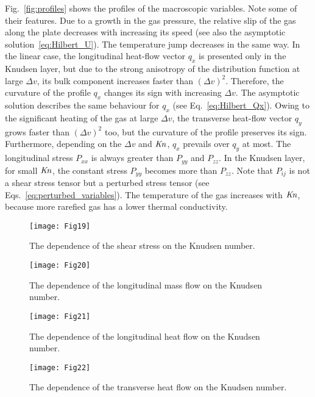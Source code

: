 \documentclass[final]{jfm} %
\newcommand{\Kn}{\mbox{\textit{Kn}}}
\begin{document}
Fig.~\ref{fig:profiles} shows the profiles of the macroscopic variables.
Note some of their features.
Due to a growth in the gas pressure, the relative slip of the gas along the plate decreases
with increasing its speed (see also the asymptotic solution~\eqref{eq:Hilbert_U}).
The temperature jump decreases in the same way.
In the linear case, the longitudinal heat-flow vector \(q_x\) is presented only in the Knudsen layer,
but due to the strong anisotropy of the distribution function at large \(\Delta{v}\),
its bulk component increases faster than \((\Delta{v})^2\).
Therefore, the curvature of the profile \(q_x\) changes its sign with increasing \(\Delta{v}\).
The asymptotic solution describes the same behaviour for \(q_x\) (see Eq.~\eqref{eq:Hilbert_Qx}).
Owing to the significant heating of the gas at large \(\Delta{v}\),
the transverse heat-flow vector \(q_y\) grows faster than \((\Delta{v})^2\) too,
but the curvature of the profile preserves its sign.
Furthermore, depending on the \(\Delta{v}\) and \(\Kn\), \(q_x\) prevails over \(q_y\) at most.
The longitudinal stress \(P_{xx}\) is always greater than \(P_{yy}\) and \(P_{zz}\).
In the Knudsen layer, for small \(\Kn\), the constant stress \(P_{yy}\) becomes more than \(P_{zz}\).
Note that \(P_{ij}\) is not a shear stress tensor but a perturbed stress tensor
(see Eqs.~\eqref{eq:perturbed_variables}).
The temperature of the gas increases with \(\Kn\), because more rarefied gas
has a lower thermal conductivity.

\begin{figure}
    \centering
    \texttt{[image: Fig19]}
    \caption{The dependence of the shear stress on the Knudsen number.}
    \label{fig:shear}
\end{figure}

\begin{figure}
    \centering
    \texttt{[image: Fig20]}
    \caption{The dependence of the longitudinal mass flow on the Knudsen number.}
    \label{fig:flow}
\end{figure}

\begin{figure}
    \centering
    \texttt{[image: Fig21]}
    \caption{The dependence of the longitudinal heat flow on the Knudsen number.}
    \label{fig:qflow}
\end{figure}

\begin{figure}
    \centering
    \texttt{[image: Fig22]}
    \caption{The dependence of the transverse heat flow on the Knudsen number.}
    \label{fig:qflowy}
\end{figure}
\end{document}
